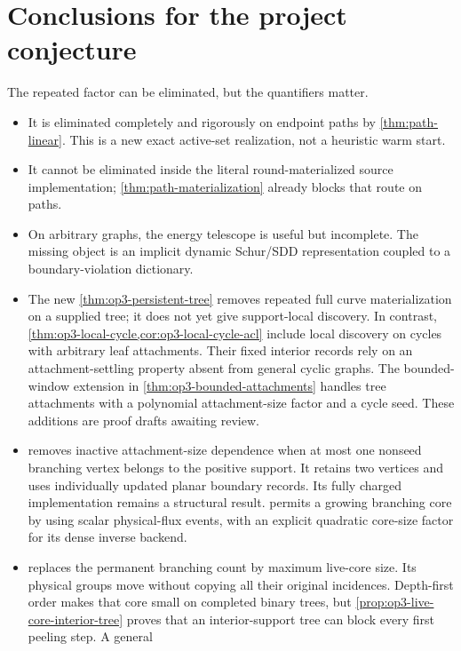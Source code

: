 \documentclass[11pt]{article}
\begin{document}
\section{Conclusions for the project conjecture}
\label{sec:conclusion}

The repeated factor can be eliminated, but the quantifiers matter.

\begin{itemize}
\item It is eliminated completely and rigorously on endpoint paths by
\cref{thm:path-linear}.  This is a new exact active-set realization, not a
heuristic warm start.
\item It cannot be eliminated inside the literal round-materialized source
implementation; \cref{thm:path-materialization} already blocks that route on
paths.
\item On arbitrary graphs, the energy telescope is useful but incomplete.
The missing object is an implicit dynamic Schur/SDD representation coupled to
a boundary-violation dictionary.
\item The new \cref{thm:op3-persistent-tree} removes repeated full curve
materialization on a supplied tree; it does not yet give support-local
discovery. In contrast, \cref{thm:op3-local-cycle,cor:op3-local-cycle-acl}
include local discovery on cycles with arbitrary leaf attachments. Their
fixed interior records rely on an attachment-settling property absent from
general cyclic graphs. The bounded-window extension in
\cref{thm:op3-bounded-attachments} handles tree attachments with a
polynomial attachment-size factor and a cycle seed. These additions are
proof drafts awaiting review.
\item {} removes inactive attachment-size
dependence when at most one nonseed branching vertex belongs to the positive
support. It retains two vertices and uses individually updated planar
boundary records. Its fully charged implementation remains a structural
result.  permits a growing branching core by
using scalar physical-flux events, with an explicit quadratic core-size
factor for its dense inverse backend.
\item {} replaces the permanent branching
count by maximum live-core size. Its physical groups move without copying
all their original incidences. Depth-first order makes that core small on
completed binary trees, but \cref{prop:op3-live-core-interior-tree} proves
that an interior-support tree can block every first peeling step. A general

\end{itemize}
\end{document}
